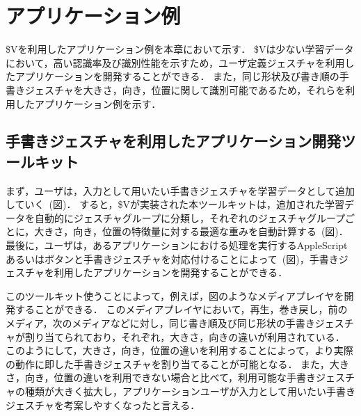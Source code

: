 \chapter{アプリケーション例}
\$Vを利用したアプリケーション例を本章において示す．
\$Vは少ない学習データにおいて，高い認識率及び識別性能を示すため，ユーザ定義ジェスチャを利用したアプリケーションを開発することができる．
また，同じ形状及び書き順の手書きジェスチャを大きさ，向き，位置に関して識別可能であるため，それらを利用したアプリケーション例を示す．

\section{手書きジェスチャを利用したアプリケーション開発ツールキット}
まず，ユーザは，入力として用いたい手書きジェスチャを学習データとして追加していく~(図)．
すると，\$Vが実装された本ツールキットは，追加された学習データを自動的にジェスチャグループに分類し，それぞれのジェスチャグループごとに，大きさ，向き，位置の特徴量に対する最適な重みを自動計算する~(図)．
最後に，ユーザは，あるアプリケーションにおける処理を実行するAppleScriptあるいはボタンと手書きジェスチャを対応付けることによって~(図)，手書きジェスチャを利用したアプリケーションを開発することができる．


このツールキット使うことによって，例えば，図のようなメディアプレイヤを開発することができる．
このメディアプレイヤにおいて，再生，巻き戻し，前のメディア，次のメディアなどに対し，同じ書き順及び同じ形状の手書きジェスチャが割り当てられており，それぞれ，大きさ，向きの違いが利用されている．
このようにして，大きさ，向き，位置の違いを利用することによって，より実際の動作に即した手書きジェスチャを割り当てることが可能となる．
また，大きさ，向き，位置の違いを利用できない場合と比べて，利用可能な手書きジェスチャの種類が大きく拡大し，アプリケーションユーザが入力として用いたい手書きジェスチャを考案しやすくなったと言える．
